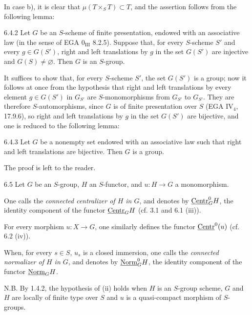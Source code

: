 In case b), it is clear that $\mu(T\times_ST)\subset T$, and the assertion follows from the following lemma:
\begin{lemma}{6.4.2}\label{VIB.6.4.2}
Let $G$ be an $S$-scheme of finite presentation, endowed with an associative law (in the sense of EGA 0$_{\mathrm{III}}$ 8.2.5). Suppose that, for every $S$-scheme $S'$ and every $g\in G(S')$, right and left translations by $g$ in the set $G(S')$ are injective and $G(S)\ne\varnothing$. Then $G$ is an $S$-group.
\end{lemma}
It suffices to show that, for every $S$-scheme $S'$, the set $G(S')$ is a group; now it follows at once from the hypothesis that right and left translations by every element $g\in G(S')$ in $G_{S'}$ are $S$-monomorphisms from $G_{S'}$ to $G_{S'}$. They are therefore $S$-automorphisms, since $G$ is of finite presentation over $S$ (EGA IV$_4$, 17.9.6), so right and left translations by $g$ in the set $G(S')$ are bijective, and one is reduced to the following lemma:
\begin{lemma}{6.4.3}\label{VIB.6.4.3}
Let $G$ be a nonempty set endowed with an associative law such that right and left translations are bijective. Then $G$ is a group.
\end{lemma}
The proof is left to the reader.
\begin{definition}{6.5}\label{VIB.6.5}
Let $G$ be an $S$-group, $H$ an $S$-functor, and $u:H\to G$ a monomorphism.
\begin{enumeratei}
\item One calls the \emph{connected centralizer of $H$ in $G$}, and denotes by $\underline{\mathrm{Centr}}_G^0H$, the identity component of the functor $\underline{\mathrm{Centr}}_GH$ (cf. 3.1 and 6.1 (iii)).
\item[(i$'$)] For every morphism $u:X\to G$, one similarly defines the functor $\underline{\mathrm{Centr}}^0(u)$ (cf. 6.2 (iv)).
\item[(ii)] When, for every $s\in S$, $u_s$ is a closed immersion, one calls the \emph{connected normalizer of $H$ in $G$}, and denotes by $\underline{\mathrm{Norm}}_G^0H$, the identity component of the functor $\underline{\mathrm{Norm}}_GH$.
\end{enumeratei}
N.B. By 1.4.2, the hypothesis of (ii) holds when $H$ is an $S$-group scheme, $G$ and $H$ are locally of finite type over $S$ and $u$ is a quasi-compact morphism of $S$-groups.
\end{definition}
